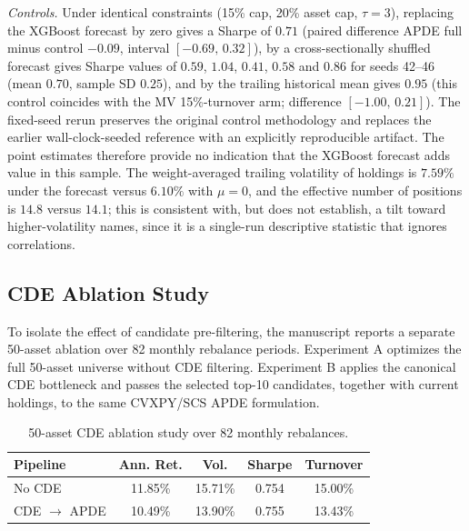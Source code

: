 \documentclass[conference]{IEEEtran}
\begin{document}
\emph{Controls.} Under identical constraints (15\% cap, 20\% asset cap,
$\tau=3$), replacing the XGBoost forecast by zero gives a Sharpe of
$0.71$ (paired difference APDE full minus control $-0.09$, interval
$[-0.69,\,0.32]$), by a cross-sectionally shuffled forecast gives
Sharpe values of $0.59$, $1.04$, $0.41$, $0.58$ and $0.86$ for seeds
42--46 (mean $0.70$, sample SD $0.25$), and by the trailing historical
mean gives $0.95$ (this control coincides with the MV 15\%-turnover arm;
difference $[-1.00,\,0.21]$). The fixed-seed rerun preserves the
original control methodology and replaces the earlier wall-clock-seeded
reference with an explicitly reproducible artifact. The point estimates
therefore provide no indication that the XGBoost forecast adds value in
this sample. The
weight-averaged trailing volatility of holdings is $7.59\%$ under the
forecast versus $6.10\%$ with $\mu=0$, and the effective number of
positions is $14.8$ versus $14.1$; this is consistent with, but does
not establish, a tilt toward higher-volatility names, since it is a
single-run descriptive statistic that ignores correlations.

\subsection{CDE Ablation Study}
\label{sec:cde-ablation}

To isolate the effect of candidate pre-filtering, the manuscript reports
a separate 50-asset ablation over 82 monthly rebalance
periods. Experiment A optimizes the full 50-asset universe without CDE
filtering. Experiment B applies the canonical CDE bottleneck and passes
the selected top-10 candidates, together with current holdings, to the
same CVXPY/SCS APDE formulation.

\begin{table}[t]
\caption{50-asset CDE ablation study over 82 monthly rebalances.}
\label{tab:cde-ablation}
\centering
\scriptsize
\setlength{\tabcolsep}{3pt}
\renewcommand{\arraystretch}{1.15}
\begin{tabular}{@{}lcccc@{}}
\toprule
\textbf{Pipeline} & \textbf{Ann. Ret.} & \textbf{Vol.} &
\textbf{Sharpe} & \textbf{Turnover}\\
\midrule
No CDE & 11.85\% & 15.71\% & 0.754 & 15.00\%\\
CDE $\rightarrow$ APDE & 10.49\% & 13.90\% & 0.755 & 13.43\%\\
\bottomrule
\end{tabular}
\end{table}
\end{document}
